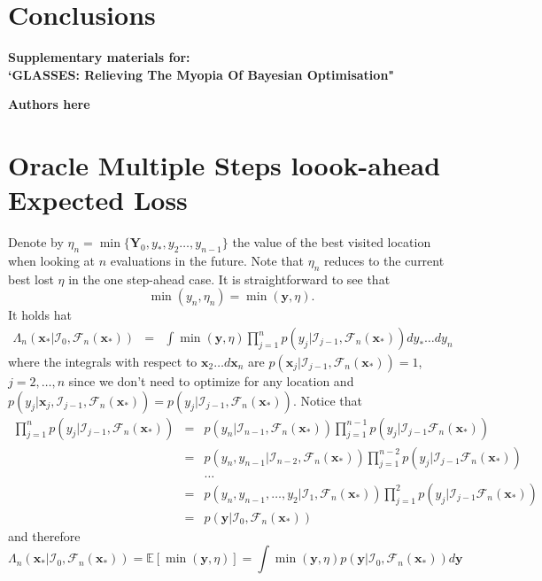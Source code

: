 \documentclass[twoside]{article}
\newcommand{\I}{\mathcal{I}}
\newcommand{\E}{\mathbb{E}}
\newcommand{\bx}{\textbf{x}}
\newcommand{\bY}{\textbf{Y}}
\newcommand{\by}{\textbf{y}}
\newcommand{\future}{\mathcal{F}}
\begin{document}
\section{Conclusions}




\newpage
\clearpage
\setcounter{section}{0}
\setcounter{equation}{0}
\renewcommand{\thesection}{S\arabic{section}}
\renewcommand{\theequation}{S.\arabic{equation}}
\onecolumn
\begin{center}
{\Large  \textbf{Supplementary materials for:\\
`GLASSES: Relieving The Myopia Of Bayesian Optimisation"}}
\end{center}
\begin{center}
\textbf{Authors here}
\end{center}

\section{Oracle Multiple Steps loook-ahead Expected Loss }
Denote by $\eta_n = \min \{\bY_0, y_*, y_2\dots,y_{n-1}\}$ the value of the best visited location when looking at $n$ evaluations in the future. Note that $\eta_n$ reduces to the current best lost $\eta$ in the one step-ahead case. It is straightforward to see that 
$$ \min (y_n,\eta_n) = \min (\by,\eta ).$$
It holds hat
\begin{eqnarray}\label{eq:oracle_expected_nonmyopic_loss}
\Lambda_n(\bx_*|\I_0, \future_{n}(\bx_*)) & = & \int \min (\by,\eta) \prod_{j=1}^{n}p(y_{j}|\I_{j-1}, \future_{n}(\bx_*)) dy_*\dots dy_n
\end{eqnarray}
where the integrals with respect to $\bx_2\dots d\bx_n$ are  $p(\bx_{j}|\I_{j-1}, \future_{n}(\bx_*))=1$, $j=2,\dots,n$ since we don't need to optimize for any location and $p(y_{j}|\bx_{j},\I_{j-1}, \future_{n}(\bx_*))=p(y_{j}|\I_{j-1}, \future_{n}(\bx_*))$. Notice that
\begin{eqnarray}\nonumber
\prod_{j=1}^{n}p(y_{j}|\I_{j-1}, \future_{n}(\bx_*))& =& p(y_n|\I_{n-1}, \future_{n}(\bx_*)) \prod_{j=1}^{n-1}p(y_{j}|\I_{j-1} \future_{n}(\bx_*))\\\nonumber
& = & p(y_n,y_{n-1}|\I_{n-2}, \future_{n}(\bx_*))  \prod_{j=1}^{n-2}p(y_{j}|\I_{j-1} \future_{n}(\bx_*))\\\nonumber
& & \dots \\\nonumber
& = & p(y_n,y_{n-1},\dots,y_2|\I_{1}, \future_{n}(\bx_*))\prod_{j=1}^{2}p(y_{j}|\I_{j-1} \future_{n}(\bx_*))\\\nonumber
& = & p(\by|\I_{0}, \future_{n}(\bx_*)) \nonumber
\end{eqnarray}
and therefore 
$$ \Lambda_n(\bx_*|\I_0, \future_{n}(\bx_*)) =\E [\min (\by,\eta)] =\int \min (\by,\eta)p(\by|\I_{0}, \future_{n}(\bx_*))d\by  $$
\end{document}
